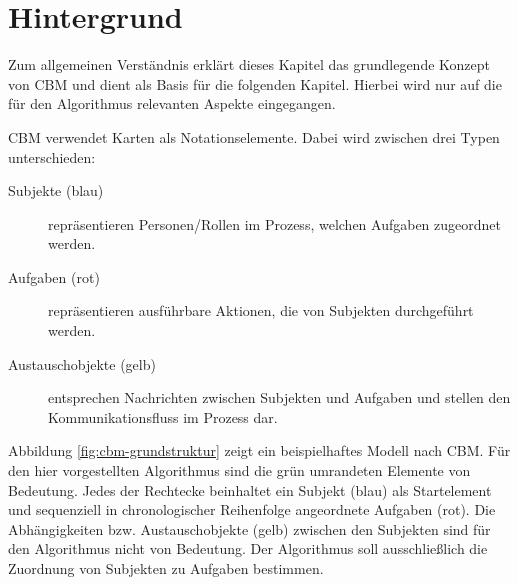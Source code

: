 %
%
% 
% 
% 

\chapter{Hintergrund} %
\label{cha:hintergrund}
Zum allgemeinen Verständnis erklärt dieses Kapitel das grundlegende Konzept von CBM und dient als Basis für die folgenden Kapitel. Hierbei wird nur auf die für den Algorithmus relevanten Aspekte eingegangen. 

CBM verwendet Karten als Notationselemente. Dabei wird zwischen drei Typen unterschieden:
\begin{description}
	\item[Subjekte (blau)] repräsentieren Personen/Rollen im Prozess, welchen Aufgaben zugeordnet werden.
	\item[Aufgaben (rot)] repräsentieren ausführbare Aktionen, die von Subjekten durchgeführt werden.
	\item[Austauschobjekte (gelb)] entsprechen Nachrichten zwischen Subjekten und Aufgaben und stellen den Kommunikationsfluss im Prozess dar.
\end{description}

Abbildung \ref{fig:cbm-grundstruktur} zeigt ein beispielhaftes Modell nach CBM. Für den hier vorgestellten Algorithmus sind die grün umrandeten Elemente von Bedeutung. Jedes der Rechtecke beinhaltet ein Subjekt (blau) als Startelement und sequenziell in chronologischer Reihenfolge angeordnete Aufgaben (rot). Die Abhängigkeiten bzw. Austauschobjekte (gelb) zwischen den Subjekten sind für den Algorithmus nicht von Bedeutung. Der Algorithmus soll ausschließlich die Zuordnung von Subjekten zu Aufgaben bestimmen.


